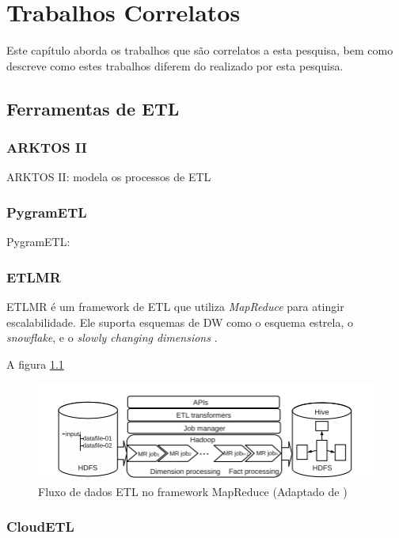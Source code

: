 \chapter{Trabalhos Correlatos}

\noindent Este capítulo aborda os trabalhos que são correlatos a esta pesquisa, bem como descreve como estes trabalhos diferem do realizado
por esta pesquisa.
\clearpage

\section{Ferramentas de ETL}



\subsection{ARKTOS II}
ARKTOS II: modela os processos de ETL

\subsection{PygramETL}
PygramETL: 

\subsection{ETLMR}
ETLMR é um framework de ETL que utiliza \textit{MapReduce} para atingir escalabilidade. Ele suporta esquemas de DW como o esquema estrela, o \textit{snowflake}, e o \textit{slowly changing dimensions} \cite{liu:2011}. 

A figura \ref{etlmr} 

\begin{figure}[h]
	\centering
	\includegraphics[scale=0.7]{fig/cloudetl.png}
	\caption{Fluxo de dados ETL no framework MapReduce (Adaptado de \cite{liu:2011})}
	\label{etlmr}
\end{figure}


\subsection{CloudETL}

